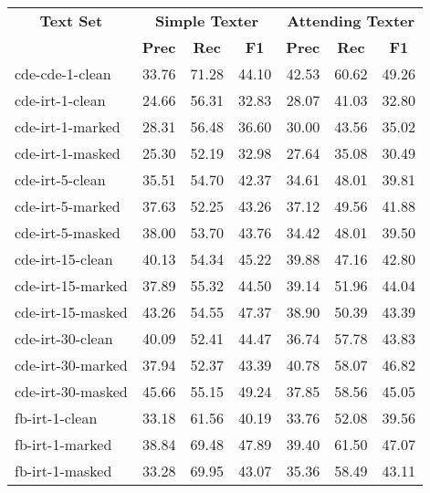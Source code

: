 \begin{tabular}{| l | r | r | r | r | r | r |}
    \hline

    \multicolumn{1}{|c|}{\textbf{Text Set}} &
    \multicolumn{3}{|c|}{\textbf{Simple Texter}}
    &
    \multicolumn{3}{|c|}{\textbf{Attending Texter}}
    \\

    \multicolumn{1}{|c|}{} &
    \multicolumn{1}{|c|}{\textbf{Prec}} &
    \multicolumn{1}{|c|}{\textbf{Rec}}
    &
    \multicolumn{1}{|c|}{\textbf{F1}}
    &
    \multicolumn{1}{|c|}{\textbf{Prec}}
    &
    \multicolumn{1}{|c|}{\textbf{Rec}}
    &
    \multicolumn{1}{|c|}{\textbf{F1}}
    \\

    \hline \hline

    cde-cde-1-clean   & 33.76 & 71.28 & 44.10 & 42.53 & 60.62 & 49.26 \\ \hline
    cde-irt-1-clean   & 24.66 & 56.31 & 32.83 & 28.07 & 41.03 & 32.80 \\
    cde-irt-1-marked  & 28.31 & 56.48 & 36.60 & 30.00 & 43.56 & 35.02 \\
    cde-irt-1-masked  & 25.30 & 52.19 & 32.98 & 27.64 & 35.08 & 30.49 \\ \hline
    cde-irt-5-clean   & 35.51 & 54.70 & 42.37 & 34.61 & 48.01 & 39.81 \\
    cde-irt-5-marked  & 37.63 & 52.25 & 43.26 & 37.12 & 49.56 & 41.88 \\
    cde-irt-5-masked  & 38.00 & 53.70 & 43.76 & 34.42 & 48.01 & 39.50 \\ \hline
    cde-irt-15-clean  & 40.13 & 54.34 & 45.22 & 39.88 & 47.16 & 42.80 \\
    cde-irt-15-marked & 37.89 & 55.32 & 44.50 & 39.14 & 51.96 & 44.04 \\
    cde-irt-15-masked & 43.26 & 54.55 & 47.37 & 38.90 & 50.39 & 43.39 \\ \hline
    cde-irt-30-clean  & 40.09 & 52.41 & 44.47 & 36.74 & 57.78 & 43.83 \\
    cde-irt-30-marked & 37.94 & 52.37 & 43.39 & 40.78 & 58.07 & 46.82 \\
    cde-irt-30-masked & 45.66 & 55.15 & 49.24 & 37.85 & 58.56 & 45.05 \\ \hline \hline
    fb-irt-1-clean    & 33.18 & 61.56 & 40.19 & 33.76 & 52.08 & 39.56 \\
    fb-irt-1-marked   & 38.84 & 69.48 & 47.89 & 39.40 & 61.50 & 47.07 \\
    fb-irt-1-masked   & 33.28 & 69.95 & 43.07 & 35.36 & 58.49 & 43.11 \\ \hline

\end{tabular}
